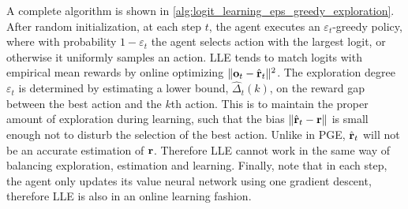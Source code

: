 A complete algorithm is shown in \cref{alg:logit_learning_eps_greedy_exploration}. After random initialization, at each step $t$, the agent executes an $\varepsilon_t$-greedy policy, where with probability $1 - \varepsilon_t$ the agent selects action with the largest logit, or otherwise it uniformly samples an action. LLE tends to match logits with empirical mean rewards by online optimizing $\| {\mathbf{o}}_t - \hat{{\mathbf{r}}}_t\|^2$.
The exploration degree $\varepsilon_t$ is determined by estimating a lower bound, $\hat{\Delta}_t(k)$, on the reward gap between the best action and the $k$th action. This is to maintain the proper amount of exploration during learning, such that the bias $\| \hat{{\mathbf{r}}}_t - {\mathbf{r}} \|$ is small enough not to disturb the selection of the best action. Unlike in PGE, $\hat{{\mathbf{r}}}_t$ will not be an accurate estimation of ${\mathbf{r}}$. Therefore LLE cannot work in the same way of balancing exploration, estimation and learning. Finally, note that in each step, the agent only updates its value neural network using one gradient descent, therefore LLE is also in an online learning fashion.

